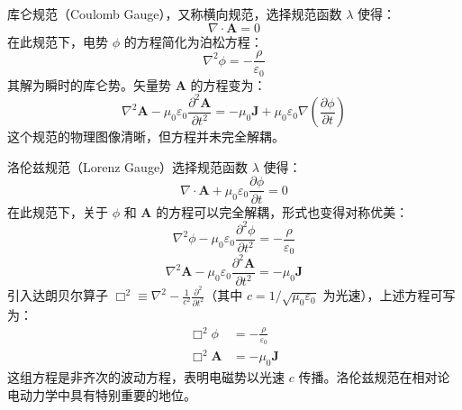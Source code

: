\documentclass[fontset=none]{ctexart}
\begin{document}
\begin{definition}[库仑规范]
    库仑规范（Coulomb Gauge），又称横向规范，选择规范函数 $\lambda$ 使得：
    \begin{equation}
        \nabla \cdot \bm{A} = 0
    \end{equation}
    在此规范下，电势 $\phi$ 的方程简化为泊松方程：
    \begin{equation}
        \nabla^2 \phi = -\frac{\rho}{\varepsilon_0}
    \end{equation}
    其解为瞬时的库仑势。矢量势 $\bm{A}$ 的方程变为：
    \begin{equation}
        \nabla^2 \bm{A} - \mu_0 \varepsilon_0 \frac{\partial^2 \bm{A}}{\partial t^2} = -\mu_0 \bm{J} + \mu_0 \varepsilon_0 \nabla\left(\frac{\partial \phi}{\partial t}\right)
    \end{equation}
    这个规范的物理图像清晰，但方程并未完全解耦。
\end{definition}

\begin{definition}[洛伦兹规范]
    洛伦兹规范（Lorenz Gauge）选择规范函数 $\lambda$ 使得：
    \begin{equation}
        \nabla \cdot \bm{A} + \mu_0 \varepsilon_0 \frac{\partial \phi}{\partial t} = 0
    \end{equation}
    在此规范下，关于 $\phi$ 和 $\bm{A}$ 的方程可以完全解耦，形式也变得对称优美：
    \begin{equation}
        \nabla^2 \phi - \mu_0 \varepsilon_0 \frac{\partial^2 \phi}{\partial t^2} = -\frac{\rho}{\varepsilon_0}
    \end{equation}
    \begin{equation}
        \nabla^2 \bm{A} - \mu_0 \varepsilon_0 \frac{\partial^2 \bm{A}}{\partial t^2} = -\mu_0 \bm{J}
    \end{equation}
    引入达朗贝尔算子 $\Box^2 \equiv \nabla^2 - \frac{1}{c^2}\frac{\partial^2}{\partial t^2}$（其中 $c = 1/\sqrt{\mu_0 \varepsilon_0}$ 为光速），上述方程可写为：
    \begin{equation}
        \begin{aligned}
            \Box^2 \phi &= -\frac{\rho}{\varepsilon_0} \\
            \Box^2 \bm{A} &= -\mu_0 \bm{J}
        \end{aligned}
    \end{equation}
    这组方程是非齐次的波动方程，表明电磁势以光速 $c$ 传播。洛伦兹规范在相对论电动力学中具有特别重要的地位。
\end{definition}
\end{document}
